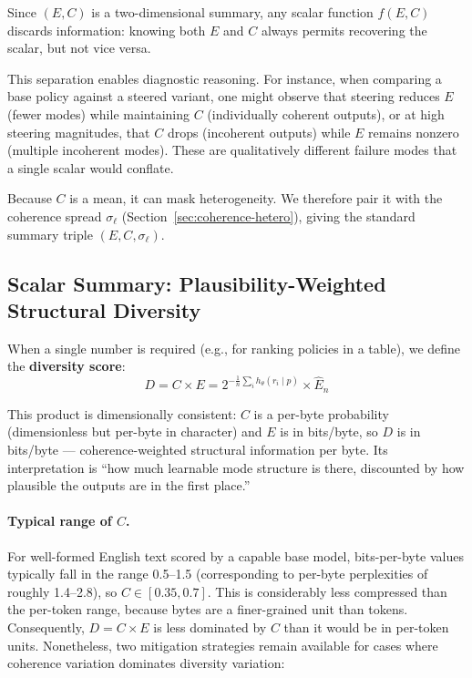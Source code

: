 \documentclass[11pt]{article}
\begin{document}
Since $(E, C)$ is a two-dimensional summary, any scalar function $f(E, C)$ discards information: knowing both $E$ and $C$ always permits recovering the scalar, but not vice versa.

This separation enables diagnostic reasoning. For instance, when comparing a base policy against a steered variant, one might observe that steering reduces $E$ (fewer modes) while maintaining $C$ (individually coherent outputs), or at high steering magnitudes, that $C$ drops (incoherent outputs) while $E$ remains nonzero (multiple incoherent modes). These are qualitatively different failure modes that a single scalar would conflate.

Because $C$ is a mean, it can mask heterogeneity. We therefore pair it with the coherence spread $\sigma_\ell$ (Section~\ref{sec:coherence-hetero}), giving the standard summary triple $(E, C, \sigma_\ell)$.

\subsection{Scalar Summary: Plausibility-Weighted Structural Diversity}

When a single number is required (e.g., for ranking policies in a table), we define the \textbf{diversity score}:
\begin{equation}\label{eq:D}
    D = C \times E = 2^{-\frac{1}{n}\sum_i h_\theta(r_i \mid p)} \times \hat{E}_n
\end{equation}

This product is dimensionally consistent: $C$ is a per-byte probability (dimensionless but per-byte in character) and $E$ is in bits/byte, so $D$ is in bits/byte --- coherence-weighted structural information per byte. Its interpretation is ``how much learnable mode structure is there, discounted by how plausible the outputs are in the first place.''

\paragraph{Typical range of $C$.} For well-formed English text scored by a capable base model, bits-per-byte values typically fall in the range 0.5--1.5 (corresponding to per-byte perplexities of roughly 1.4--2.8), so $C \in [0.35, 0.7]$. This is considerably less compressed than the per-token range, because bytes are a finer-grained unit than tokens. Consequently, $D = C \times E$ is less dominated by $C$ than it would be in per-token units. Nonetheless, two mitigation strategies remain available for cases where coherence variation dominates diversity variation:
\end{document}
